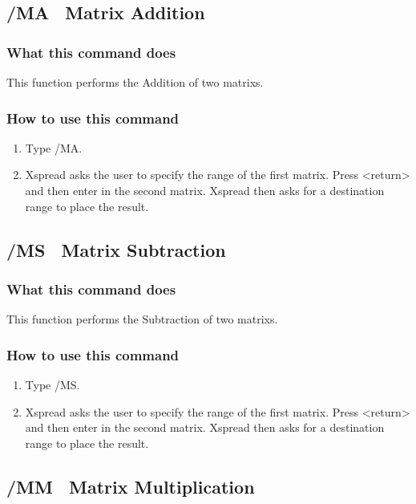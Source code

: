 \subsection*{/MA \      Matrix Addition}

\subsubsection*{What this command does}
This function performs the Addition of two matrixs.

\subsubsection*{How to use this command}
\begin{enumerate}
\item{Type /MA.}
\item{Xspread asks the user to specify the range of the first matrix.  Press <return>
      and then enter in the second matrix.  Xspread then asks for a destination range
      to place the result.}
\end{enumerate}

\subsection*{/MS \      Matrix Subtraction}

\subsubsection*{What this command does}
This function performs the Subtraction of two matrixs.

\subsubsection*{How to use this command}
\begin{enumerate}
\item{Type /MS.}
\item{Xspread asks the user to specify the range of the first matrix.  Press <return>
      and then enter in the second matrix.  Xspread then asks for a destination range
      to place the result.}
\end{enumerate}

\subsection*{/MM \      Matrix Multiplication}


